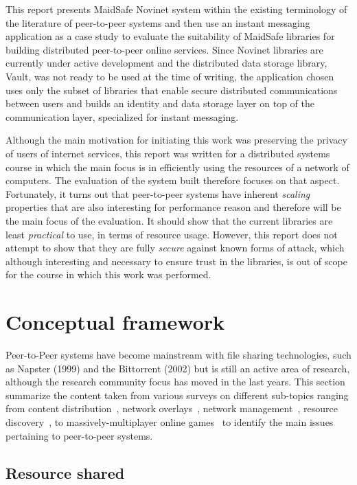 This report presents MaidSafe Novinet system within the existing terminology of the literature of peer-to-peer systems and then use an instant messaging application as a case study to evaluate the suitability of MaidSafe libraries for building distributed peer-to-peer online services. Since Novinet libraries are currently under active development and the distributed data storage library, Vault, was not ready to be used at the time of writing, the application chosen uses only the subset of libraries that enable secure distributed communications between users and builds an identity and data storage layer on top of the communication layer, specialized for instant messaging.

Although the main motivation for initiating this work was preserving the privacy of users of internet services, this report was written for a distributed systems course in which the main focus is in efficiently using the resources of a network of computers. The evaluation of the system built therefore focuses on that aspect. Fortunately, it turns out that peer-to-peer systems have inherent \textit{scaling} properties that are also interesting for performance reason and therefore will be the main focus of the evaluation. It should show that the current libraries are least \textit{practical} to use, in terms of resource usage. However, this report does not attempt to show that they are fully \textit{secure} against known forms of attack, which although interesting and necessary to ensure trust in the libraries, is out of scope for the course in which this work was performed.

\section{Conceptual framework}

Peer-to-Peer systems have become mainstream with file sharing technologies, such as Napster (1999) and the Bittorrent (2002) but is still an active area of research, although the research community focus has moved in the last years. This section summarize the content taken from various surveys on different sub-topics ranging from content distribution~\cite{Androutsellis-Theotokis:2004}, network overlays~\cite{Lua:2005}, network management~\cite{Amad:2012}, resource discovery~\cite{Lazaro:2013}, to massively-multiplayer online games~\cite{Yahyavi:2014} to identify the main issues pertaining to peer-to-peer systems.

\subsection{Resource shared}

